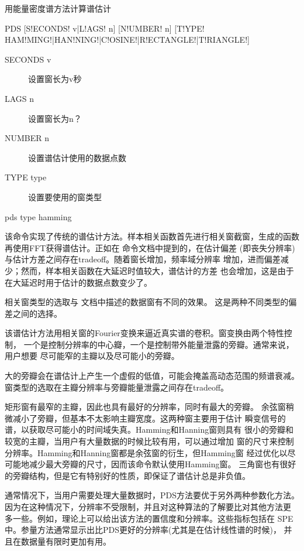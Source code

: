 \label{spe:pds}

用能量密度谱方法计算谱估计

\begin{SACSTX}
PDS [S!ECONDS! v|L!AGS! n] [N!UMBER! n]
    [T!YPE! HAM!MING!|HAN!NING!|C!OSINE!|R!ECTANGLE!|T!RIANGLE!]
\end{SACSTX}

\begin{description}
\item [SECONDS v] 设置窗长为v秒
\item [LAGS n] 设置窗长为n？
\item [NUMBER n] 设置谱估计使用的数据点数
\item [TYPE type] 设置要使用的窗类型
\end{description}

\begin{SACDFT}
pds type hamming
\end{SACDFT}

该命令实现了传统的谱估计方法。样本相关函数首先进行相关窗截窗，生成的函数
再使用FFT获得谱估计。正如在  命令文档中提到的，在估计偏差
(即丧失分辨率)与估计方差之间存在tradeoff。随着窗长增加，频率域分辨率
增加，进而偏差减少；然而，样本相关函数在大延迟时值较大，谱估计的方差
也会增加，这是由于在大延迟时用于估计的数据点数变少了。

相关窗类型的选取与  文档中描述的数据窗有不同的效果。
这是两种不同类型的偏差之间的选择。

该谱估计方法用相关窗的Fourier变换来逼近真实谱的卷积。窗变换由两个特性控制，
一个是控制分辨率的中心瓣，一个是控制带外能量泄露的旁瓣。通常来说，用户想要
尽可能窄的主瓣以及尽可能小的旁瓣。

大的旁瓣会在谱估计上产生一个虚假的低值，可能会掩盖高动态范围的频谱衰减。
窗类型的选取在主瓣分辨率与旁瓣能量泄露之间存在tradeoff。

矩形窗有最窄的主瓣，因此也具有最好的分辨率，同时有最大的旁瓣。
余弦窗稍微减小了旁瓣，但基本不太影响主瓣宽度。这两种窗主要用于估计
瞬变信号的谱，以获取尽可能小的时间域失真。Hamming和Hanning窗则具有
很小的旁瓣和较宽的主瓣，当用户有大量数据的时候比较有用，可以通过增加
窗的尺寸来控制分辨率。Hamming和Hanning窗都是余弦窗的衍生，但Hamming窗
经过优化以尽可能地减少最大旁瓣的尺寸，因而该命令默认使用Hamming窗。
三角窗也有很好的旁瓣结构，但是它有特别好的性质，即保证了谱估计总是非负值。

通常情况下，当用户需要处理大量数据时，PDS方法要优于另外两种参数化方法。
因为在这种情况下，分辨率不受限制，并且对这种算法的了解要比对其他方法更
多一些。例如，理论上可以给出该方法的置信度和分辨率。这些指标包括在
SPE中。参量方法通常显示出比PDS更好的分辨率(尤其是在估计线性谱的时候)，
并且在数据量有限时更加有用。
